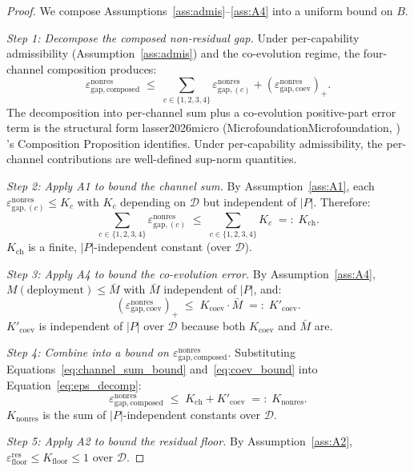 \documentclass{article}
\makeatletter
\newcommand{\citep}[2][]{%
  \begingroup
  \def\@tmpkey{#2}%
  \ifx\@tmpkey\@empty\else
    (\ifx\@empty#1\@empty\else #1, \fi
     \@nameuse{bibkey@\@tmpkey})%
  \fi
  \endgroup
}
\newcommand{\epsfloor}{\varepsilon_{\mathrm{floor}}^{\mathrm{res}}}
\newcommand{\epsnonresComposed}{\varepsilon_{\mathrm{gap},\mathrm{composed}}^{\mathrm{nonres}}}
\newcommand{\epsnonresChannel}[1]{\varepsilon_{\mathrm{gap},(#1)}^{\mathrm{nonres}}}
\newcommand{\epsnonresCoev}{\varepsilon_{\mathrm{gap},\mathrm{coev}}^{\mathrm{nonres}}}
\makeatother
\begin{document}
\begin{proof}
We compose Assumptions~\ref{ass:admis}--\ref{ass:A4} into a uniform
bound on $B$.

\emph{Step 1: Decompose the composed non-residual gap.}
Under per-capability admissibility (Assumption~\ref{ass:admis}) and
the co-evolution regime, the four-channel composition produces:
\begin{equation}
\label{eq:eps_decomp}
  \epsnonresComposed \;\leq\; \sum_{c \in \{1,2,3,4\}}
  \epsnonresChannel{c} + (\epsnonresCoev)_+.
\end{equation}
The decomposition into per-channel sum plus a co-evolution
positive-part error term is the structural form
\citep[Microfoundation]{lasser2026micro}'s Composition Proposition
identifies. Under per-capability admissibility, the per-channel
contributions are well-defined sup-norm quantities.

\emph{Step 2: Apply A1 to bound the channel sum.}
By Assumption~\ref{ass:A1}, each $\epsnonresChannel{c} \leq K_c$
with $K_c$ depending on $\mathcal{D}$ but independent of $|P|$.
Therefore:
\begin{equation}
\label{eq:channel_sum_bound}
  \sum_{c \in \{1,2,3,4\}} \epsnonresChannel{c}
  \;\leq\; \sum_{c \in \{1,2,3,4\}} K_c
  \;=:\; K_{\mathrm{ch}}.
\end{equation}
$K_{\mathrm{ch}}$ is a finite, $|P|$-independent constant (over
$\mathcal{D}$).

\emph{Step 3: Apply A4 to bound the co-evolution error.}
By Assumption~\ref{ass:A4}, $M(\text{deployment}) \leq \bar{M}$
with $\bar{M}$ independent of $|P|$, and:
\begin{equation}
\label{eq:coev_bound}
  (\epsnonresCoev)_+ \;\leq\; K_{\mathrm{coev}} \cdot \bar{M}
  \;=:\; K'_{\mathrm{coev}}.
\end{equation}
$K'_{\mathrm{coev}}$ is independent of $|P|$ over $\mathcal{D}$
because both $K_{\mathrm{coev}}$ and $\bar{M}$ are.

\emph{Step 4: Combine into a bound on $\epsnonresComposed$.}
Substituting Equations~\ref{eq:channel_sum_bound}
and~\ref{eq:coev_bound} into Equation~\ref{eq:eps_decomp}:
\begin{equation}
\label{eq:eps_total_bound}
  \epsnonresComposed \;\leq\; K_{\mathrm{ch}} + K'_{\mathrm{coev}}
  \;=:\; K_{\mathrm{nonres}}.
\end{equation}
$K_{\mathrm{nonres}}$ is the sum of $|P|$-independent constants
over $\mathcal{D}$.

\emph{Step 5: Apply A2 to bound the residual floor.}
By Assumption~\ref{ass:A2}, $\epsfloor \leq K_{\mathrm{floor}} \leq
1$ over $\mathcal{D}$.


\end{proof}
\end{document}
